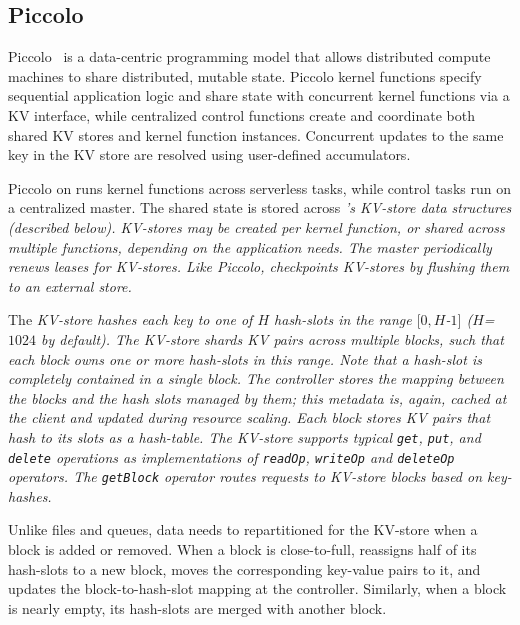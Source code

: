 \subsection{Piccolo}
\label{ssec:piccolo}

Piccolo~\cite{piccolo} is a data-centric programming model that allows
distributed compute machines to share distributed,
mutable state. Piccolo
kernel functions specify sequential application logic and share
state with concurrent kernel functions via a KV
interface, while centralized control functions create and coordinate both shared
KV stores and kernel function instances. Concurrent updates to 
the same key in the KV store are resolved using 
user-defined accumulators. 

Piccolo on \jiffy runs kernel functions across serverless tasks, while
control tasks run on a centralized master. The shared
state is stored across \sl's KV-store data 
structures (described below). KV-stores may be created per kernel function, 
or shared across multiple functions, depending on the application needs. 
The master periodically renews 
leases for \sl KV-stores. Like Piccolo,
\sl checkpoints KV-stores by flushing them to an external 
store.

 The \sl KV-store hashes each key to one of $H$ hash-slots in the range $[0,H$-$1]$ ($H$=$1024$ by default). The KV-store shards KV pairs across multiple \jiffy blocks, such that each block owns one or more hash-slots in this range. Note that a hash-slot is completely contained in a single block. The controller stores the mapping between the blocks and the hash slots managed by them; this metadata is, again, cached at the client and updated during resource scaling. Each block stores KV pairs that hash to its slots as a hash-table. The KV-store supports typical \texttt{get}, \texttt{put}, and \texttt{delete} operations as implementations of \texttt{readOp}, \texttt{writeOp} and \texttt{deleteOp} operators. The \texttt{getBlock} operator routes requests to KV-store blocks based on key-hashes. 

Unlike files and queues, data needs to repartitioned for the KV-store when a block is added or removed. When a block is close-to-full, \jiffy reassigns half of its hash-slots to a new block, moves the corresponding key-value pairs to it, and updates the block-to-hash-slot mapping at the controller. Similarly, when a block is nearly empty, its hash-slots are merged with another block. 



